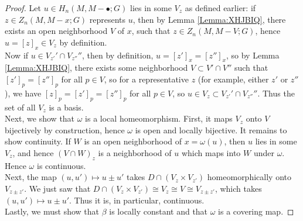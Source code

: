 \documentclass[reqno]{amsart}
\theoremstyle{definition}
\theoremstyle{remark}
\begin{document}
\begin{proof}
    Let $u \in 
    H_n (M , M - \bullet;G)$ lies in some
    $V_z$ as defined earlier: if $z \in 
    Z_n (M, M - x;G)$ represents $u$, then by Lemma
    \ref{Lemma:XHJBIQ}, there exists an open neighborhood
    $V$ of $x$, such that $z
    \in Z_n (M , M-V;G)$, hence
    $u = \left[ z \right]_x \in V_z $ by definition.\\
    Now if $u \in V_{z'}' \cap V_{z''}''$, then
    by definition,
    $u = \left[ z' \right]_x = \left[ z'' \right]_x$, so
    by Lemma \ref{Lemma:XHJBIQ}, there
    exists some neighborhood $V \subset V' \cap V''$ such that
    $\left[ z' \right]_p = \left[ z'' \right]_p$ for all
    $p \in V$, so for a representative $z$ (for example,
    either $z'$ or $z''$ ), we have
    $\left[ z \right]_p = \left[ z' \right]_p = \left[ z'' \right]_p$ 
    for all $p \in V$, so
    $u \in V_z \subset V_{z'}' \cap V_{z''}''$.
    Thus the set of all $V_z$ is a basis.\\
    \linebreak
    Next, we show that $\omega$ is a local homeomorphism.
    First, it maps $V_z$ onto $V$ bijectively by construction, hence
    $\omega$ is open and locally bijective. It remains to show continuity.
    If $W$ is an open neighborhood of
    $x = \omega (u)$, then $u$ lies in some
    $V_z$, and hence
    $(V \cap W)_z$ is a neighborhood of $u$ which maps
    into $W$ under $\omega$. Hence $\omega$ is continuous.\\
    \linebreak
    Next, the map
    $(u, u') \mapsto u\pm u'$ takes
    $D \cap (V_z \times V_{z'})$ homeomorphically onto
    $V_{z \pm z'}$. We just saw that
    $D \cap \left( V_z \times V_{z'} \right) \cong
    V_z \cong V \cong V_{z \pm z'}$, which takes
    $(u,u') \mapsto u \pm u'$. Thus it is, in particular, continuous.\\
    \linebreak
    Lastly, we must show that
    $\beta$ is locally constant and that
    $\omega$ is a covering map.


\end{proof}
\end{document}
